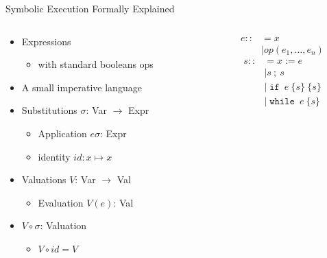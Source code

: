 \documentclass{beamer}
\DeclareMathOperator{\ifs}{\mathtt{if}}
\DeclareMathOperator{\whiles}{\mathtt{while}}
\begin{document}
\begin{frame}{Symbolic Execution Formally Explained~\cite{boer2021}}
  \begin{columns}[t]
    \begin{column}{.6\textwidth}
      \begin{itemize}
        \item Expressions
              \begin{itemize}
                \item with standard booleans ops
              \end{itemize}
        \item A small imperative language
        \item Substitutions $\sigma$: Var $\rightarrow$ Expr
              \begin{itemize}
                \item Application $e\sigma$: Expr
                \item identity $id : x \mapsto x$
              \end{itemize}
        \item Valuations $V$: Var $\rightarrow$ Val
              \begin{itemize}
                \item Evaluation $V(e)$: Val
              \end{itemize}
        \item $V \circ \sigma$: Valuation
              \begin{itemize}
                \item $V \circ id = V$
              \end{itemize}
      \end{itemize}
    \end{column}%
    \begin{column}{.4\textwidth}
      \begin{align*}
        e ::&= x \\
            & \mid op(e_{1},\ldots, e_{n})
      \end{align*}
      \begin{align*}
        s ::&= x := e\\
            & \mid s~;~s\\
            & \mid \ifs~e~\{s\}~\{s\}\\
            & \mid \whiles~e~\{s\}
      \end{align*}
    \end{column}
  \end{columns}
\end{frame}
\end{document}
